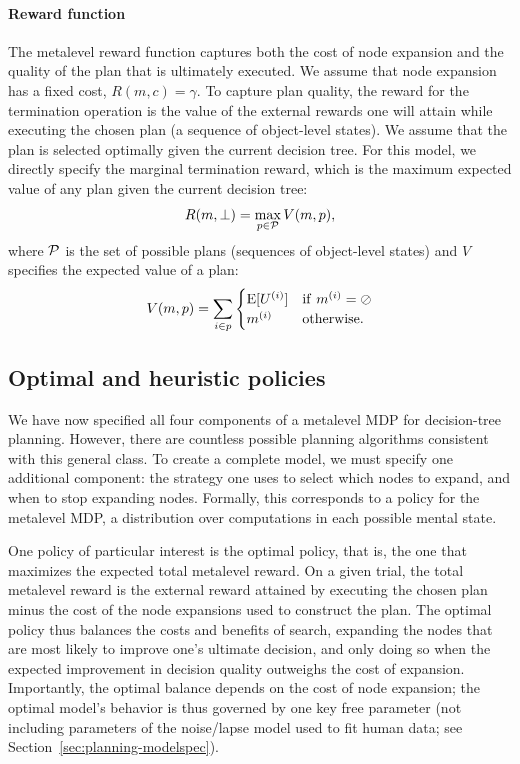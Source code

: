 \paragraph{Reward function}

The metalevel reward function captures both the cost of node expansion and the quality of the plan that is ultimately executed. We assume that node expansion has a fixed cost, $R(m, c) = \gamma$. To capture plan quality, the reward for the termination operation is the value of the external rewards one will attain while executing the chosen plan (a sequence of object-level states). We assume that the plan is selected optimally given the current decision tree. For this model, we directly specify the marginal termination reward, which is the maximum expected value of any plan given the current decision tree:
\begin{equation}
R(m, \bot) = \max_{p \in \P} V(m, p),
\end{equation}
where $\P$ is the set of possible plans (sequences of object-level states) and $V$ specifies the expected value of a plan:
\begin{equation}
  V(m, p) = \sum_{i \in p} 
\begin{cases}
\E[U^{(i)}] &\mathrm{if\ } m^{(i)} = \oslash \\
m^{(i)} &\mathrm{otherwise}.
\end{cases}
\end{equation}


\subsection{Optimal and heuristic policies}
We have now specified all four components of a metalevel MDP for decision-tree planning. However, there are countless possible planning algorithms consistent with this general class. To create a complete model, we must specify one additional component: the strategy one uses to select which nodes to expand, and when to stop expanding nodes. Formally, this corresponds to a policy for the metalevel MDP, a distribution over computations in each possible mental state.

One policy of particular interest is the optimal policy, that is, the one that maximizes the expected total metalevel reward. On a given trial, the total metalevel reward is the external reward attained by executing the chosen plan minus the cost of the node expansions used to construct the plan. The optimal policy thus balances the costs and benefits of search, expanding the nodes that are most likely to improve one's ultimate decision, and only doing so when the expected improvement in decision quality outweighs the cost of expansion.  Importantly, the optimal balance depends on the cost of node expansion; the optimal model's behavior is thus governed by one key free parameter (not including parameters of the noise/lapse model used to fit human data; see Section~\ref{sec:planning-modelspec}).

